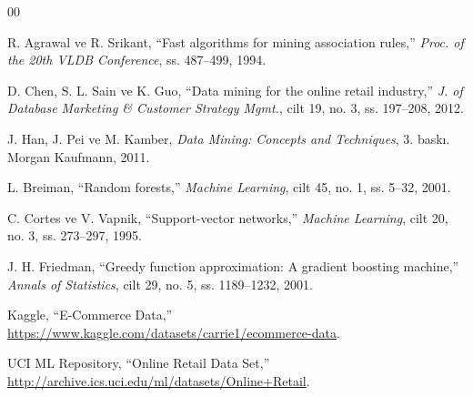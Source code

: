 \documentclass[conference]{IEEEtran}
\begin{document}
\begin{thebibliography}{00}

 R. Agrawal ve R. Srikant, ``Fast algorithms for mining association rules,'' \textit{Proc. of the 20th VLDB Conference}, ss. 487--499, 1994.

 D. Chen, S. L. Sain ve K. Guo, ``Data mining for the online retail industry,'' \textit{J. of Database Marketing \& Customer Strategy Mgmt.}, cilt 19, no. 3, ss. 197--208, 2012.

 J. Han, J. Pei ve M. Kamber, \textit{Data Mining: Concepts and Techniques}, 3. baskı. Morgan Kaufmann, 2011.

 L. Breiman, ``Random forests,'' \textit{Machine Learning}, cilt 45, no. 1, ss. 5--32, 2001.

 C. Cortes ve V. Vapnik, ``Support-vector networks,'' \textit{Machine Learning}, cilt 20, no. 3, ss. 273--297, 1995.

 J. H. Friedman, ``Greedy function approximation: A gradient boosting machine,'' \textit{Annals of Statistics}, cilt 29, no. 5, ss. 1189--1232, 2001.

 Kaggle, ``E-Commerce Data,'' \url{https://www.kaggle.com/datasets/carrie1/ecommerce-data}.

 UCI ML Repository, ``Online Retail Data Set,'' \url{http://archive.ics.uci.edu/ml/datasets/Online+Retail}.

\end{thebibliography}
\end{document}

